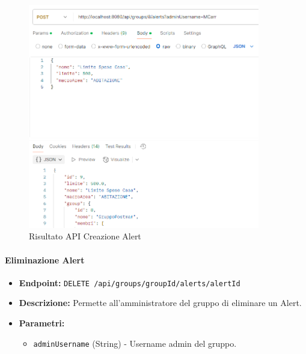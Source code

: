 \begin{figure}[H]
    \centering
    \includegraphics[width=0.9\textwidth]{images/createAlert.png}
    \caption{Risultato API Creazione Alert}
    \label{fig:api_createAlert}
\end{figure}

\paragraph{Eliminazione Alert}

\begin{itemize}
    \item \textbf{Endpoint:} \texttt{DELETE /api/groups/{groupId}/alerts/{alertId}}
    \item \textbf{Descrizione:} Permette all'amministratore del gruppo di eliminare un Alert.
    \item \textbf{Parametri:}
    \begin{itemize}
        \item \texttt{adminUsername} (String) - Username admin del gruppo.
    \end{itemize}
\end{itemize}

